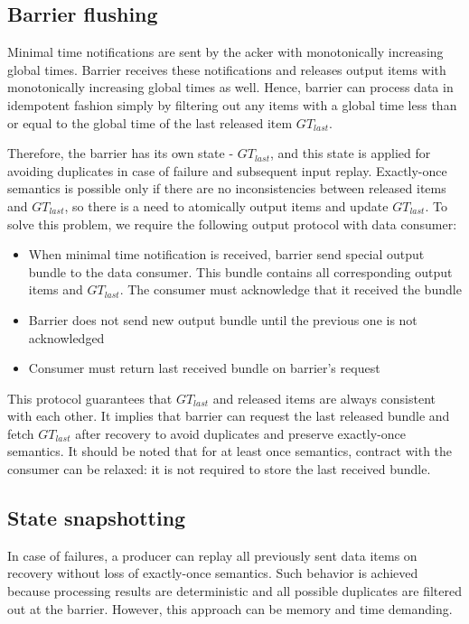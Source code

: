 \subsection{Barrier flushing}
Minimal time notifications are sent by the acker with monotonically increasing global times. Barrier receives these notifications and releases output items with monotonically increasing global times as well. Hence, barrier can process data in idempotent fashion simply by filtering out any items with a global time less than or equal to the global time of the last released item $GT_{last}$. 

Therefore, the barrier has its own state - $GT_{last}$, and this state is applied for avoiding duplicates in case of failure and subsequent input replay. Exactly-once semantics is possible only if there are no inconsistencies between released items and $GT_{last}$, so there is a need to atomically output items and update $GT_{last}$. To solve this problem, we require the following output protocol with data consumer: 

\begin{itemize}
    \item When minimal time notification is received, barrier send special output bundle to the data consumer. This bundle contains all corresponding output items and $GT_{last}$. The consumer must acknowledge that it received the bundle
    \item Barrier does not send new output bundle until the previous one is not acknowledged
    \item Consumer must return last received bundle on barrier's request 
\end{itemize}

This protocol guarantees that $GT_{last}$ and released items are always consistent with each other. It implies that barrier can request the last released bundle and fetch $GT_{last}$ after recovery to avoid duplicates and preserve exactly-once semantics. It should be noted that for at least once semantics, contract with the consumer can be relaxed: it is not required to store the last received bundle.

\subsection{State snapshotting}
In case of failures, a producer can replay all previously sent data items on recovery without loss of exactly-once semantics. Such behavior is achieved because processing results are deterministic and all possible duplicates are filtered out at the barrier. However, this approach can be memory and time demanding. 

